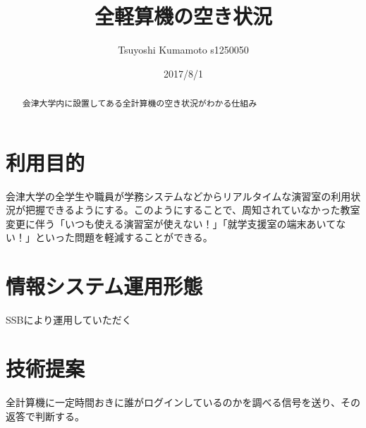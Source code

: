 \documentclass[a4paper]{jarticle}
\title{全軽算機の空き状況}
\author{Tsuyoshi Kumamoto s1250050}
\date{2017/8/1}
\begin{document}
\maketitle
\begin{abstract}
  会津大学内に設置してある全計算機の空き状況がわかる仕組み
\end{abstract}
\section{利用目的}
会津大学の全学生や職員が学務システムなどからリアルタイムな演習室の利用状況が把握できるようにする。このようにすることで、周知されていなかった教室変更に伴う「いつも使える演習室が使えない！」「就学支援室の端末あいてない！」といった問題を軽減することができる。\\
\section{情報システム運用形態}
SSBにより運用していただく\\
\section{技術提案}
全計算機に一定時間おきに誰がログインしているのかを調べる信号を送り、その返答で判断する。\\
\end{document}
